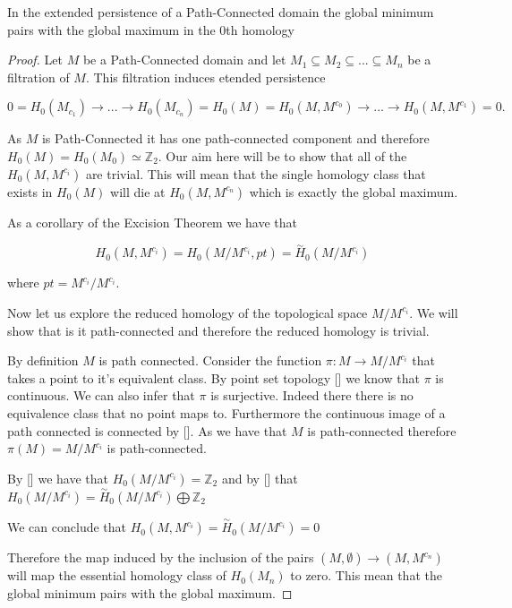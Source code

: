 \begin{prop} In the extended persistence of a Path-Connected domain the global minimum pairs with the global maximum in the 0th homology \end{prop}

\begin{proof}
    Let $M$ be a Path-Connected domain and let $M_1 \subseteq M_2 \subseteq ... \subseteq M_n$ be a filtration of $M$. This filtration induces etended persistence 

$$ 0 = H_0(M_{c_1}) \rightarrow ... \rightarrow H_0(M_{c_n}) = H_0(M) = H_0(M, M^{c_0}) \rightarrow ... \rightarrow H_0(M, M^{c_{1}}) = 0.$$

As $M$ is Path-Connected it has one path-connected component and therefore $H_0(M) = H_0(M_0) \simeq  \mathbb{Z}_2$.  Our aim here will be to show that all of the $H_0(M, M^{c_i})$ are trivial. This will mean that the single homology class that exists in $H_0(M)$ will die at $H_0(M, M^{c_n})$ which is exactly the global maximum.


As a corollary of the Excision Theorem we have that

$$H_0(M, M^{c_i}) = H_0(M / M^{c_i}, pt) = \overset{\sim}{H}_0(M / M^{c_i})$$  

where $pt = M^{c_i} / M^{c_i}$.

Now let us explore the reduced homology of the topological space $M / M^{c_i}$. We will show that is it path-connected and therefore the reduced homology is trivial.


By definition $M$ is path connected. Consider the function $\pi: M \to M/ M^{c_i}$ that takes a point to it's equivalent class. By point set topology [] we know that $\pi$ is continuous. We can also infer that $\pi$ is surjective. Indeed there there is no equivalence class that no point maps to. Furthermore the continuous image of a path connected is connected by []. As we have that $M$ is path-connected therefore $\pi(M) = M / M^{c_i}$ is path-connected. 

By [] we have that $H_0(M / M^{c_i}) = \mathbb{Z}_2$ and by [] that $H_0(M / M^{c_i}) = \overset{\sim}{H}_0(M / M^{c_i}) \bigoplus \mathbb{Z}_2$

We can conclude that $H_0(M, M^{c_i}) = \overset{\sim}{H}_0(M / M^{c_i}) = 0$

Therefore the map induced by the inclusion of the pairs $(M, \emptyset) \to (M, M^{c_n})$ will map the essential homology class of $H_0(M_n)$ to zero. This mean that the global minimum pairs with the global maximum.


\end{proof}









